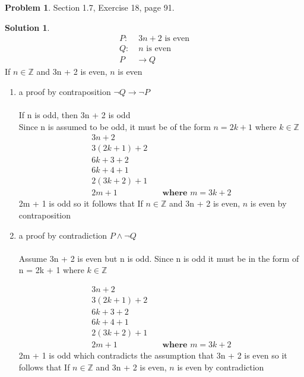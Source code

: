\documentclass{article}
\theoremstyle{definition}
\newtheorem{problem}{Problem}
\newtheorem*{solution}{Solution}
\begin{document}
\begin{problem} Section 1.7, Exercise 18, page 91.
\end{problem}
\begin{solution} \ \\
\begin{align*}
  P:&\; 3n + 2 \text{ is even} \\
  Q:& \; n \text{ is even} \\
  P &\rightarrow Q
\end{align*}
If $n \in \mathbb{Z}$ and  3n + 2 is even, $n$ is even
\begin{enumerate}
  \item a proof by contraposition $\lnot Q \rightarrow \lnot P$ \\ \ \\
  If n is odd, then 3n + 2 is odd \\
  Since n is assumed to be odd, it must be of the form $n = 2k + 1$ where $k \in \mathbb{Z}$
  \begin{align*}
    3n + 2 \\
    3(2k + 1) + 2 \\
    6k + 3 + 2 \\
    6k + 4 + 1 \\
    2(3k + 2) + 1 \\
    2m + 1& \quad \textbf{where $m = 3k + 2$}
  \end{align*}
  2m + 1 is odd so it follows that If $n \in \mathbb{Z}$ and  3n + 2 is even, $n$ is even by contraposition

  \item a proof by contradiction $P \land \lnot Q$ \\ \ \\
  Assume 3n + 2 is even but n is odd. Since n is odd it must be in the form of n = 2k + 1 where $k \in \mathbb{Z}$

    \begin{align*}
    3n + 2 \\
    3(2k + 1) + 2 \\
    6k + 3 + 2 \\
    6k + 4 + 1 \\
    2(3k + 2) + 1 \\
    2m + 1& \quad \textbf{where $m = 3k + 2$}
  \end{align*}
  2m + 1 is odd which contradicts the assumption that 3n + 2 is even so it follows that If $n \in \mathbb{Z}$ and  3n + 2 is even, $n$ is even by contradiction  
\end{enumerate}
\end{solution}
\end{document}
